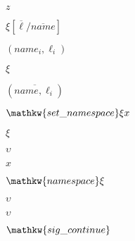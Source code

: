 \documentclass[10pt]{book}
\begin{document}
\begin{mdSnippets}
\begin{mdInlineSnippet}[fbade9e36a3f36d3d676c1b808451dd7]
$z$\end{mdInlineSnippet}%
\begin{mdInlineSnippet}[13415a9c0521afc175c7816d35c0d1f9]%
$\xi[\overline{\ell}/\overline{name}]$\end{mdInlineSnippet}%
\begin{mdInlineSnippet}%
$(name_i, \ell_i)$\end{mdInlineSnippet}%
\begin{mdInlineSnippet}%
$\xi$\end{mdInlineSnippet}%
\begin{mdInlineSnippet}[2602b93c02526404dc5f58a66ed9c54c]%
$(\overline{name,\ell_i})$\end{mdInlineSnippet}%
\begin{mdInlineSnippet}[e5b79e91a5bb3bf29cb295869de15cb3]%
$\mathkw{set\_namespace} \xi x$\end{mdInlineSnippet}%
\begin{mdInlineSnippet}%
$\xi$\end{mdInlineSnippet}%
\begin{mdInlineSnippet}[5470b9993b5d776db89f25ac7cfff3a1]%
$\upsilon$\end{mdInlineSnippet}%
\begin{mdInlineSnippet}[9dd4e461268c8034f5c8564e155c67a6]%
$x$\end{mdInlineSnippet}%
\begin{mdInlineSnippet}[c0a4b0c2983d026a6489b7520e2196a6]%
$\mathkw{namespace} \xi$\end{mdInlineSnippet}%
\begin{mdInlineSnippet}[5470b9993b5d776db89f25ac7cfff3a1]%
$\upsilon$\end{mdInlineSnippet}%
\begin{mdInlineSnippet}[5470b9993b5d776db89f25ac7cfff3a1]%
$\upsilon$\end{mdInlineSnippet}%
\begin{mdInlineSnippet}[98247ea362074947efbf1724bf49a710]%
$\mathkw{sig\_continue}$\end{mdInlineSnippet}%
\begin{mdInlineSnippet}%

\end{mdInlineSnippet}
\end{mdSnippets}
\end{document}
